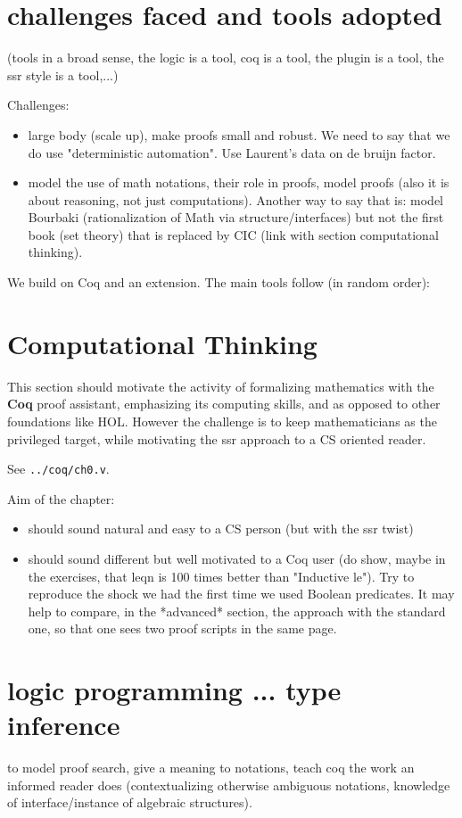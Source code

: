 \section{challenges faced and tools adopted}
(tools in a broad sense, the logic is a tool, coq is a tool, the plugin
is a tool, the ssr style is a tool,...)

Challenges:
\begin{itemize}
\item large body (scale up), make proofs small and robust.
	We need to say that we do use "deterministic automation".
	Use Laurent's data on de bruijn factor.
\item model the use of math notations, their role in proofs, model proofs (also
	it is about reasoning, not just computations). Another way to say that
	is: model Bourbaki (rationalization of Math via structure/interfaces)
	but not the first book (set theory) that is replaced by CIC (link with
	section computational thinking).
\end{itemize}

We build on Coq and an extension.  The main tools follow (in random order):

\section{Computational Thinking}\label{ch:compthink}

This section should motivate the activity of formalizing mathematics
with the {\bf Coq} proof assistant, emphasizing its computing skills,
and as opposed to other foundations like HOL. However the challenge is
to keep mathematicians as the privileged target, while motivating the
ssr approach to a CS oriented reader.

See \verb+../coq/ch0.v+.

Aim of the chapter:
\begin{itemize}
\item should sound natural and easy to a CS person (but with the ssr twist)
\item should sound different but well motivated to a Coq user (do show, maybe in
  the exercises, that leqn is 100 times better than "Inductive le").  Try to
  reproduce the shock we had the first time we used Boolean predicates.  It may
  help to compare, in the *advanced* section, the approach with the standard
  one, so that one sees two proof scripts in the same page.
\end{itemize}

\section{logic programming ... type inference}
to model proof search, give a meaning to notations, teach coq the
work an informed reader does (contextualizing otherwise ambiguous
notations, knowledge of interface/instance of algebraic structures).

